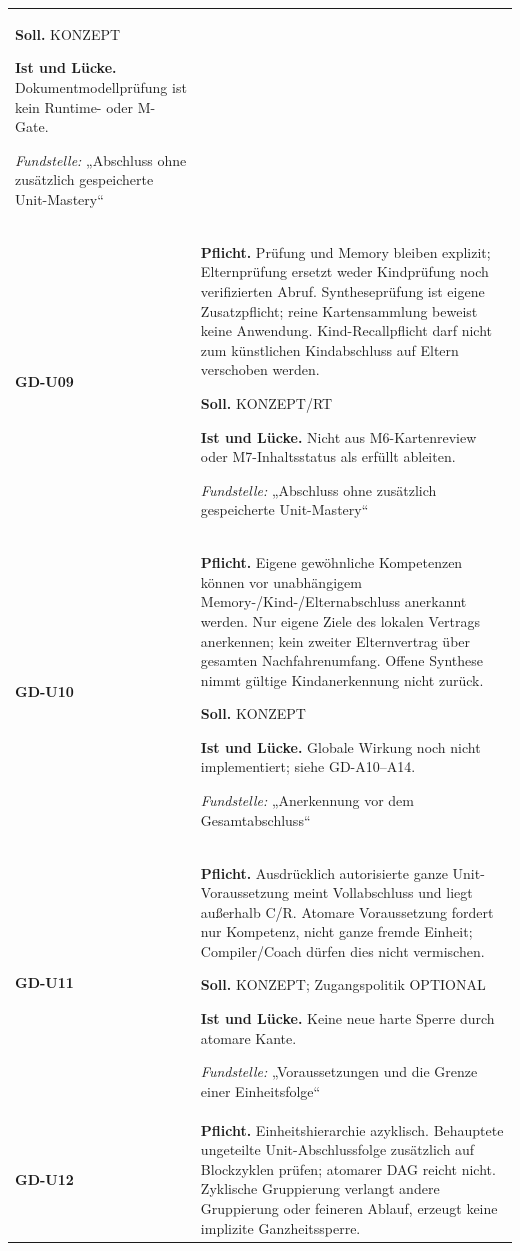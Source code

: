 \begin{longtable}{@{}P{20mm}P{128mm}@{}}
\textbf{Soll.} KONZEPT\par\smallskip
\textbf{Ist und Lücke.} Dokumentmodellprüfung ist kein Runtime- oder M-Gate.\par\smallskip
\emph{Fundstelle:} „Abschluss ohne zusätzlich gespeicherte Unit-Mastery“\\\addlinespace[5pt]
\label{rule:GD-U09}\textbf{GD-U09} &
\textbf{Pflicht.} Prüfung und Memory bleiben explizit; Elternprüfung ersetzt weder Kindprüfung noch verifizierten Abruf. Syntheseprüfung ist eigene Zusatzpflicht; reine Kartensammlung beweist keine Anwendung. Kind-Recallpflicht darf nicht zum künstlichen Kindabschluss auf Eltern verschoben werden.\par\smallskip
\textbf{Soll.} KONZEPT/RT\par\smallskip
\textbf{Ist und Lücke.} Nicht aus M6-Kartenreview oder M7-Inhaltsstatus als erfüllt ableiten.\par\smallskip
\emph{Fundstelle:} „Abschluss ohne zusätzlich gespeicherte Unit-Mastery“\\\addlinespace[5pt]
\label{rule:GD-U10}\textbf{GD-U10} &
\textbf{Pflicht.} Eigene gewöhnliche Kompetenzen können vor unabhängigem Memory-/Kind-/Elternabschluss anerkannt werden. Nur eigene Ziele des lokalen Vertrags anerkennen; kein zweiter Elternvertrag über gesamten Nachfahrenumfang. Offene Synthese nimmt gültige Kindanerkennung nicht zurück.\par\smallskip
\textbf{Soll.} KONZEPT\par\smallskip
\textbf{Ist und Lücke.} Globale Wirkung noch nicht implementiert; siehe GD-A10–A14.\par\smallskip
\emph{Fundstelle:} „Anerkennung vor dem Gesamtabschluss“\\\addlinespace[5pt]
\label{rule:GD-U11}\textbf{GD-U11} &
\textbf{Pflicht.} Ausdrücklich autorisierte ganze Unit-Voraussetzung meint Vollabschluss und liegt außerhalb C/R. Atomare Voraussetzung fordert nur Kompetenz, nicht ganze fremde Einheit; Compiler/Coach dürfen dies nicht vermischen.\par\smallskip
\textbf{Soll.} KONZEPT; Zugangspolitik OPTIONAL\par\smallskip
\textbf{Ist und Lücke.} Keine neue harte Sperre durch atomare Kante.\par\smallskip
\emph{Fundstelle:} „Voraussetzungen und die Grenze einer Einheitsfolge“\\\addlinespace[5pt]
\label{rule:GD-U12}\textbf{GD-U12} &
\textbf{Pflicht.} Einheitshierarchie azyklisch. Behauptete ungeteilte Unit-Abschlussfolge zusätzlich auf Blockzyklen prüfen; atomarer DAG reicht nicht. Zyklische Gruppierung verlangt andere Gruppierung oder feineren Ablauf, erzeugt keine implizite Ganzheitssperre.\par\smallskip

\end{longtable}
